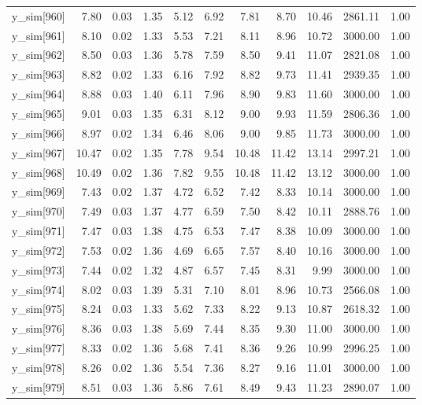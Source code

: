 \begin{table}[ht]
\begin{tabular}{rrrrrrrrrrr}
  y\_sim[960] & 7.80 & 0.03 & 1.35 & 5.12 & 6.92 & 7.81 & 8.70 & 10.46 & 2861.11 & 1.00 \\ 
  y\_sim[961] & 8.10 & 0.02 & 1.33 & 5.53 & 7.21 & 8.11 & 8.96 & 10.72 & 3000.00 & 1.00 \\ 
  y\_sim[962] & 8.50 & 0.03 & 1.36 & 5.78 & 7.59 & 8.50 & 9.41 & 11.07 & 2821.08 & 1.00 \\ 
  y\_sim[963] & 8.82 & 0.02 & 1.33 & 6.16 & 7.92 & 8.82 & 9.73 & 11.41 & 2939.35 & 1.00 \\ 
  y\_sim[964] & 8.88 & 0.03 & 1.40 & 6.11 & 7.96 & 8.90 & 9.83 & 11.60 & 3000.00 & 1.00 \\ 
  y\_sim[965] & 9.01 & 0.03 & 1.35 & 6.31 & 8.12 & 9.00 & 9.93 & 11.59 & 2806.36 & 1.00 \\ 
  y\_sim[966] & 8.97 & 0.02 & 1.34 & 6.46 & 8.06 & 9.00 & 9.85 & 11.73 & 3000.00 & 1.00 \\ 
  y\_sim[967] & 10.47 & 0.02 & 1.35 & 7.78 & 9.54 & 10.48 & 11.42 & 13.14 & 2997.21 & 1.00 \\ 
  y\_sim[968] & 10.49 & 0.02 & 1.36 & 7.82 & 9.55 & 10.48 & 11.42 & 13.12 & 3000.00 & 1.00 \\ 
  y\_sim[969] & 7.43 & 0.02 & 1.37 & 4.72 & 6.52 & 7.42 & 8.33 & 10.14 & 3000.00 & 1.00 \\ 
  y\_sim[970] & 7.49 & 0.03 & 1.37 & 4.77 & 6.59 & 7.50 & 8.42 & 10.11 & 2888.76 & 1.00 \\ 
  y\_sim[971] & 7.47 & 0.03 & 1.38 & 4.75 & 6.53 & 7.47 & 8.38 & 10.09 & 3000.00 & 1.00 \\ 
  y\_sim[972] & 7.53 & 0.02 & 1.36 & 4.69 & 6.65 & 7.57 & 8.40 & 10.16 & 3000.00 & 1.00 \\ 
  y\_sim[973] & 7.44 & 0.02 & 1.32 & 4.87 & 6.57 & 7.45 & 8.31 & 9.99 & 3000.00 & 1.00 \\ 
  y\_sim[974] & 8.02 & 0.03 & 1.39 & 5.31 & 7.10 & 8.01 & 8.96 & 10.73 & 2566.08 & 1.00 \\ 
  y\_sim[975] & 8.24 & 0.03 & 1.33 & 5.62 & 7.33 & 8.22 & 9.13 & 10.87 & 2618.32 & 1.00 \\ 
  y\_sim[976] & 8.36 & 0.03 & 1.38 & 5.69 & 7.44 & 8.35 & 9.30 & 11.00 & 3000.00 & 1.00 \\ 
  y\_sim[977] & 8.33 & 0.02 & 1.36 & 5.68 & 7.41 & 8.36 & 9.26 & 10.99 & 2996.25 & 1.00 \\ 
  y\_sim[978] & 8.26 & 0.02 & 1.36 & 5.54 & 7.36 & 8.27 & 9.16 & 11.01 & 3000.00 & 1.00 \\ 
  y\_sim[979] & 8.51 & 0.03 & 1.36 & 5.86 & 7.61 & 8.49 & 9.43 & 11.23 & 2890.07 & 1.00 \\ 

\end{tabular}
\end{table}

